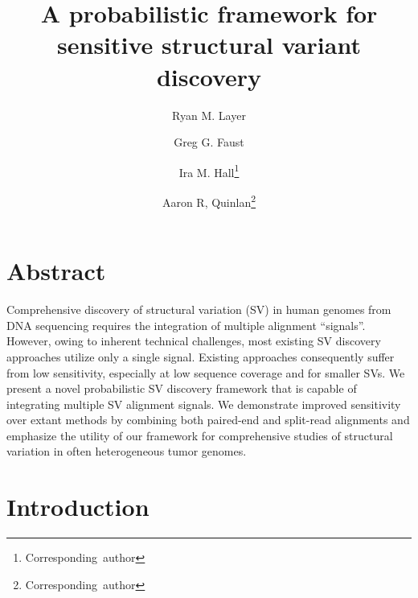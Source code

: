 \documentclass[11pt]{article}
\begin{document}
\title{A probabilistic framework for sensitive structural variant discovery}
%

\author[1]{Ryan M. Layer}
\author[1]{Greg G. Faust}
\author[2]{Ira M. Hall\thanks{\mbox{Corresponding author}}}
\author[2,3]{Aaron R, Quinlan\thanks{\mbox{Corresponding author}}}


\maketitle

\section{Abstract}
Comprehensive discovery of structural variation (SV) in human genomes from DNA
sequencing requires the integration of multiple alignment ``signals''. However,
owing to inherent technical challenges, most existing SV discovery approaches 
utilize only a single signal. Existing approaches consequently suffer from
low sensitivity, especially at low sequence coverage and for smaller SVs. We
present a novel probabilistic SV discovery framework that is capable of
integrating multiple SV alignment signals. We demonstrate improved sensitivity
over extant methods by combining both paired-end and split-read alignments and
emphasize the utility of our framework for comprehensive studies of structural
variation in often heterogeneous tumor genomes.


\section{Introduction}
\end{document}

